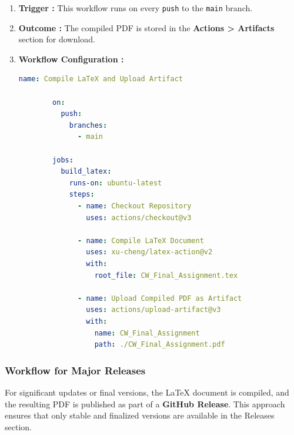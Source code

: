 \documentclass[12pt]{article}
\begin{document}
\begin{enumerate}
    \item \textbf{Trigger :} This workflow runs on every \texttt{push} to the \texttt{main} branch.
    \item \textbf{Outcome :} The compiled PDF is stored in the \textbf{Actions > Artifacts} section for download.
    \item \textbf{Workflow Configuration :}
    \begin{lstlisting}[language=yaml]
        name: Compile LaTeX and Upload Artifact
        
        on:
          push:
            branches:
              - main
        
        jobs:
          build_latex:
            runs-on: ubuntu-latest
            steps:
              - name: Checkout Repository
                uses: actions/checkout@v3
        
              - name: Compile LaTeX Document
                uses: xu-cheng/latex-action@v2
                with:
                  root_file: CW_Final_Assignment.tex
        
              - name: Upload Compiled PDF as Artifact
                uses: actions/upload-artifact@v3
                with:
                  name: CW_Final_Assignment
                  path: ./CW_Final_Assignment.pdf
        \end{lstlisting}
        
\end{enumerate}

\subsubsection*{Workflow for Major Releases}

For significant updates or final versions, the LaTeX document is compiled, and the resulting PDF is published as part of a \textbf{GitHub Release}. This approach ensures that only stable and finalized versions are available in the Releases section.
\end{document}
